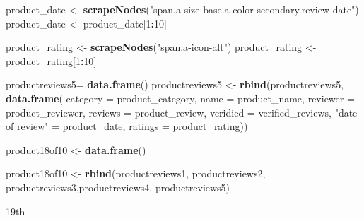 \documentclass[
]{article}
\newenvironment{Shaded}{\begin{snugshade}}{\end{snugshade}}
\newcommand{\AttributeTok}[1]{\textcolor[rgb]{0.13,0.29,0.53}{#1}}
\newcommand{\DecValTok}[1]{\textcolor[rgb]{0.00,0.00,0.81}{#1}}
\newcommand{\FunctionTok}[1]{\textcolor[rgb]{0.13,0.29,0.53}{\textbf{#1}}}
\newcommand{\NormalTok}[1]{#1}
\newcommand{\OtherTok}[1]{\textcolor[rgb]{0.56,0.35,0.01}{#1}}
\newcommand{\SpecialCharTok}[1]{\textcolor[rgb]{0.81,0.36,0.00}{\textbf{#1}}}
\newcommand{\StringTok}[1]{\textcolor[rgb]{0.31,0.60,0.02}{#1}}
\begin{document}
\begin{Shaded}
\begin{Highlighting}[]
\NormalTok{  product\_date }\OtherTok{\textless{}{-}} \FunctionTok{scrapeNodes}\NormalTok{(}\StringTok{"span.a{-}size{-}base.a{-}color{-}secondary.review{-}date"}\NormalTok{)}
\NormalTok{  product\_date }\OtherTok{\textless{}{-}}\NormalTok{ product\_date[}\DecValTok{1}\SpecialCharTok{:}\DecValTok{10}\NormalTok{]}
  
\NormalTok{  product\_rating }\OtherTok{\textless{}{-}} \FunctionTok{scrapeNodes}\NormalTok{(}\StringTok{"span.a{-}icon{-}alt"}\NormalTok{)}
\NormalTok{  product\_rating }\OtherTok{\textless{}{-}}\NormalTok{ product\_rating[}\DecValTok{1}\SpecialCharTok{:}\DecValTok{10}\NormalTok{]}
  
\NormalTok{  productreviews5}\OtherTok{=} \FunctionTok{data.frame}\NormalTok{()}
\NormalTok{  productreviews5 }\OtherTok{\textless{}{-}} \FunctionTok{rbind}\NormalTok{(productreviews5, }\FunctionTok{data.frame}\NormalTok{(}
                      \AttributeTok{category =}\NormalTok{ product\_category,}
                      \AttributeTok{name =}\NormalTok{ product\_name,}
                      \AttributeTok{reviewer =}\NormalTok{ product\_reviewer,}
                      \AttributeTok{reviews =}\NormalTok{ product\_review,}
                      \AttributeTok{veridied =}\NormalTok{ verified\_reviews,}
                      \StringTok{"date of review"} \OtherTok{=}\NormalTok{ product\_date,}
                      \AttributeTok{ratings =}\NormalTok{ product\_rating))}
  
\NormalTok{  product18of10 }\OtherTok{\textless{}{-}} \FunctionTok{data.frame}\NormalTok{()}
  
\NormalTok{  product18of10 }\OtherTok{\textless{}{-}} \FunctionTok{rbind}\NormalTok{(productreviews1, productreviews2, productreviews3,productreviews4, productreviews5)}
\end{Highlighting}
\end{Shaded}

19th
\end{document}
